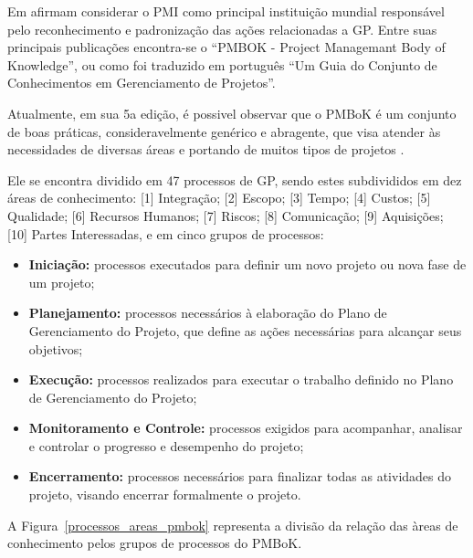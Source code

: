     Em  afirmam considerar o PMI como principal instituição mundial responsável pelo reconhecimento e padronização das ações relacionadas a GP. Entre suas principais publicações encontra-se o ``PMBOK - Project Managemant Body of Knowledge'', ou como foi traduzido em português ``Um Guia do Conjunto de Conhecimentos em Gerenciamento de Projetos''.

    Atualmente, em sua 5a edição, é possivel observar que o PMBoK é um conjunto de boas práticas, consideravelmente genérico e abragente, que visa atender às necessidades de diversas áreas e portando de muitos tipos de projetos \cite{pmiguide2013}.

    Ele se encontra dividido em 47 processos de GP, sendo estes subdivididos em dez áreas de conhecimento: [1] Integração; [2] Escopo; [3] Tempo; [4] Custos; [5] Qualidade; [6] Recursos Humanos; [7] Riscos; [8] Comunicação; [9] Aquisições; [10] Partes Interessadas, e em cinco grupos de processos:

    \begin{itemize}
      \item \textbf{Iniciação:} processos executados para definir um novo projeto ou nova fase de um projeto;
      \item \textbf{Planejamento:} processos necessários à elaboração do Plano de Gerenciamento do Projeto, que define as ações necessárias para alcançar seus objetivos;
      \item \textbf{Execução:} processos realizados para executar o trabalho definido no Plano de Gerenciamento do Projeto;
      \item \textbf{Monitoramento e Controle:} processos exigidos para acompanhar, analisar e controlar o progresso e desempenho do projeto;
      \item \textbf{Encerramento:} processos necessários para finalizar todas as atividades do projeto, visando encerrar formalmente o projeto.
    \end{itemize}

    A Figura~\ref{processos_areas_pmbok} representa a divisão da relação das àreas de conhecimento pelos grupos de processos do PMBoK.


